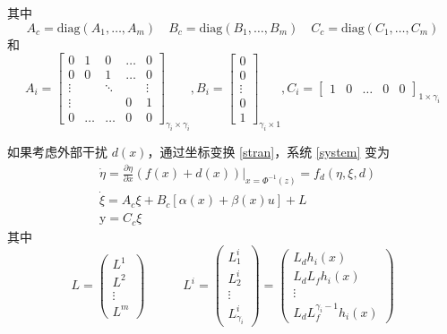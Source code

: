   其中 
  \begin{equation}
	A_c=\mathrm{diag}(A_{1},\ldots,A_{m})\quad B_c=\mathrm{diag}(B_{1},\ldots,B_{m})\quad C_c=\mathrm{diag}(C_{1},\ldots,C_{m})
  \end{equation}
  和
  \begin{equation}
	A_i=\left[\begin{array}{ccccc}0&1&0&\dots&0\\0&0&1&\dots&0\\\vdots&&\ddots&&\vdots\\\vdots&&&0&1\\0&\dots&\dots&0&0\end{array}\right]_{\gamma_i \times \gamma_i}, B_i=\left[\begin{array}{c}0\\0\\\vdots\\0\\1\end{array}\right]_{\gamma_i \times 1}, C_i=\left[\begin{array}{ccccc}1&0&\dots&0&0\end{array}\right]_{1 \times \gamma_i}
  \end{equation}
   
  如果考虑外部干扰 $d(x)$，通过坐标变换 \eqref{stran}，系统 \eqref{system} 变为 
  \begin{equation}
	\begin{aligned}
	  &\dot{\eta}=\frac{\partial\eta}{\partial x}(f(x)+d(x))\Big|_{x=\Phi^{-1}(z)}= f_{d}(\eta,\xi,d)\\
	  &\dot{\xi}= A_{c}\xi+B_{c}[\alpha(x)+\beta(x)u] + L\\
	  &\text{y}= C_{c}\xi\end{aligned}
	  \label{with_external}
  \end{equation}
  其中
  \begin{equation}
	L=\begin{pmatrix}L^1\\L^2\\\vdots\\L^m\end{pmatrix} \quad \quad \quad L^i=\begin{pmatrix}L_1^i\\L_2^i\\\vdots\\L_{\gamma_i}^i\end{pmatrix}=\begin{pmatrix}L_{d}h_{i}(x)\\L_{d}L_{f}h_{i}(x)\\\vdots\\L_{d}L_{f}^{\gamma_i -1}h_{i}(x)\end{pmatrix} 
  \end{equation}

  
  